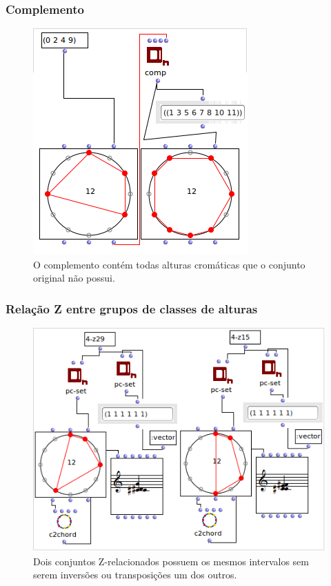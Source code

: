 \documentclass[
	12pt,				%
	openright,			%
	twoside,			%
	a4paper,			%
	english,			%
	french,				%
	spanish,			%
	brazil				%
	]{abntex2}
\begin{document}
\subsubsection{Complemento}


\begin{figure}[!h]
	\caption{\label{fig_grafico}O complemento contém todas alturas cromáticas que o conjunto original não possui. }
	\begin{center}
	    \includegraphics[scale=0.7]{OM_settheory/complemento.png}
	\end{center}
\end{figure}





\subsubsection{Relação Z entre grupos de classes de alturas}


\begin{figure}[!h]
	\caption{\label{fig_grafico}Dois conjuntos Z-relacionados possuem os mesmos intervalos sem serem inversões ou transposições um dos outros. }
	\begin{center}
	    \includegraphics[scale=0.7]{OM_settheory/Z_related.png}
	\end{center}
\end{figure}
\end{document}
